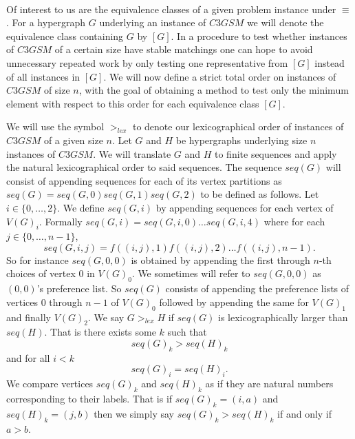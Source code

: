 \begin{definition}
\paragraph{}
Of interest to us are the equivalence classes of a given problem instance under $\equiv$. For a hypergraph $G$ underlying an instance of $C3GSM$ we will denote the equivalence class containing $G$ by $[G]$. In a procedure to test whether instances of $C3GSM$ of a certain size have stable matchings one can hope to avoid unnecessary repeated work by only testing one representative from $[G]$ instead of all instances in $[G]$. We will now define a strict total order on instances of $C3GSM$ of size $n$, with the goal of obtaining a method to test only the minimum element with respect to this order for each equivalence class $[G]$.
\begin{definition}
We will use the symbol $>_{lex}$ to denote our lexicographical order of instances of $C3GSM$ of a given size $n$. Let $G$ and $H$ be hypergraphs underlying size $n$ instances of $C3GSM$. We will translate $G$ and $H$ to finite sequences and apply the natural lexicographical order to said sequences. The sequence $seq(G)$ will consist of appending sequences for each of its vertex partitions as $seq(G) = seq(G,0)seq(G,1)seq(G,2)$ to be defined as follows. Let $i \in \{0,\dots, 2\}$.  We define $seq(G,i)$ by appending sequences for each vertex of $V(G)_i$. Formally $seq(G,i) = seq(G,i,0)\dots seq(G,i,4)$ where for each $j \in \{0,\dots, n-1\}$,
$$seq(G,i,j) = f((i,j),1)f((i,j),2)\dots f((i,j),n-1).$$
So for instance $seq(G,0, 0)$ is obtained by appending the first through $n$-th choices of vertex $0$ in $V(G)_0$. We sometimes will refer to $seq(G,0,0)$ as $(0,0)$'s preference list. So $seq(G)$ consists of appending the preference lists of vertices $0$ through $n-1$ of $V(G)_0$ followed by appending the same for $V(G)_1$ and finally $V(G)_2$.
We say $G >_{lex} H$ if $seq(G)$ is lexicographically larger than $seq(H)$. That is there exists some $k$ such that
$$seq(G)_k > seq(H)_k$$
and for all $i < k$
$$seq(G)_i = seq(H)_i.$$
We compare vertices $seq(G)_k$ and $ seq(H)_k$ as if they are natural numbers corresponding to their labels. That is if $seq(G)_k = (i,a)$ and $seq(H)_k = (j,b)$ then we simply say $seq(G)_k > seq(H)_k$ if and only if $a>b$. 
\end{definition}

\end{definition}
